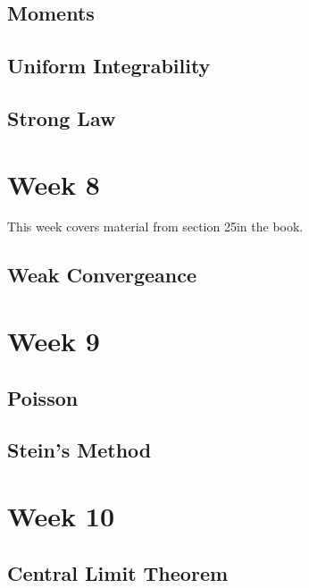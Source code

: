 \documentclass[12pt]{article}
\begin{document}
\subsection{Moments}

\subsection{Uniform Integrability}

\subsection{Strong Law}


\section{Week 8}
This week covers material from section 25in the book.

\subsection{Weak Convergeance}


\section{Week 9}

\subsection{Poisson}

\subsection{Stein's Method}


\section{Week 10}

\subsection{Central Limit Theorem}


\newpage
\begin{thebibliography}{99}

\end{thebibliography}
\end{document}
